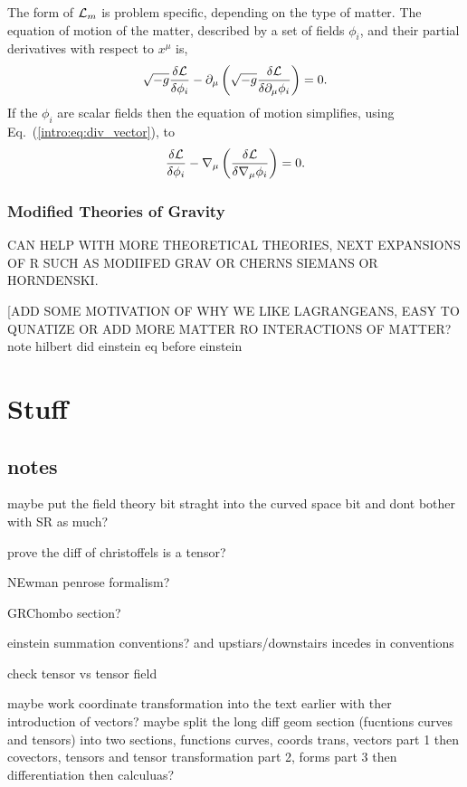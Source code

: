 The form of $\mathcal{L}_m$ is problem specific, depending on the type of matter. The equation of motion of the matter, described by a set of fields $\phi_i$, and their partial derivatives with respect to $x^\mu$ is,
\begin{equation}
\sqrt{-g}\frac{\delta \mathcal{L}}{\delta \phi_i} -\partial_\mu \left(\sqrt{-g}\frac{\delta\mathcal{L}}{\delta \partial_\mu \phi_i}\right)=0.
\end{equation}
If the $\phi_i$ are scalar fields then the equation of motion simplifies, using Eq.~(\ref{intro:eq:div_vector}), to 
\begin{equation}
\frac{\delta \mathcal{L}}{\delta \phi_i} - \nabla_\mu \left(\frac{\delta\mathcal{L}}{\delta \nabla_\mu \phi_i}\right)=0.
\end{equation}

\subsubsection*{Modified Theories of Gravity}

CAN HELP WITH MORE THEORETICAL THEORIES, NEXT EXPANSIONS OF R SUCH AS MODIIFED GRAV OR CHERNS SIEMANS OR HORNDENSKI.

[ADD SOME MOTIVATION OF WHY WE LIKE LAGRANGEANS, EASY TO QUNATIZE OR ADD MORE MATTER RO INTERACTIONS OF MATTER? note hilbert did einstein eq before einstein







\section{Stuff}
\subsection{notes}

maybe put the field theory bit straght into the curved space bit and dont bother with SR as much?

prove the diff of christoffels is a tensor?

NEwman penrose formalism? 

GRChombo section?

einstein summation conventions? and upstiars/downstairs incedes in conventions

check tensor vs tensor field

maybe work coordinate transformation into the text earlier with ther introduction of vectors? maybe split the long diff geom section (fucntions curves and tensors) into two sections, functions curves, coords trans, vectors part 1 then covectors, tensors and tensor transformation part 2, forms part 3 then differentiation then calculuas?

